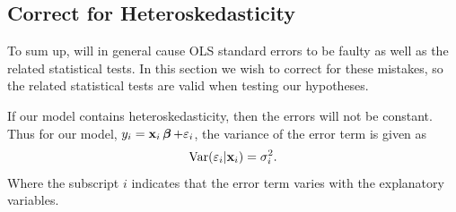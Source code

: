 

\subsection{Correct for Heteroskedasticity}
To sum up, \hetero will in general cause OLS standard errors to be faulty as well as the related statistical tests. In this section we wish to correct for these mistakes, so the related statistical tests are valid when testing our hypotheses. 

If our model contains heteroskedasticity, then the errors will not be constant. Thus for our model, $y_i = \textbf{x}_i\operatorname{\boldsymbol{\beta}} + \varepsilon_i$, the variance of the error term is given as
\begin{align*}
    \operatorname{\text{Var}}(\varepsilon_i | \mathbf{x}_i) = \sigma^2_i. 
\end{align*}
Where the subscript $i$ indicates that the error term varies with the explanatory variables. 

